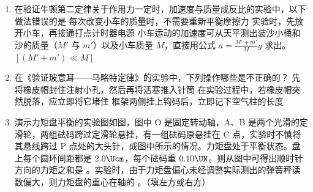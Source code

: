 \documentclass[\gkver]{gaokaozhenti}
\begin{document}
\begin{enumerate}
\item
在验证牛顿第二定律关于作用力一定时，加速度与质量成反比的实验中，以下做法错误的是
{每次改变小车的质量时，不需要重新平衡摩擦力}
{实验时，先放开小车，再接通打点计时器电源}
{小车运动的加速度可从天平测出装沙小桶和沙的质量（$M'$ 与 $m'$）以及小车质量 $M$，直接用公式 $a = \frac{M' + m'}{M}g$ 求出。$[(M' + m') \ll M]$}

\item
在《验证玻意耳——马略特定律》的实验中，下列操作哪些是不正确的？
{先将橡皮帽封住注射小孔，然后再将活塞推入针筒}
{在实验过程中，若橡皮帽突然脱落，应立即将它堵住}
{框架两侧挂上钩码后，立即记下空气柱的长度}

\item
演示力矩盘平衡的实验图如图，图中 O 是固定转动轴，A、B 是两个光滑的定滑轮，两组砝码跨过定滑轮悬挂，有一组砝码原悬挂在 C 点，实验时不慎将其悬线跨过 P 点处的大头针，成图中所示的情况。力矩盘处于平衡状态。盘上每个圆环间距都是 $2.0\Ucm$，每个砝码重 $0.10\UN$。则从图中可得出顺时针方向的力矩之和是 \tkanswer[2.4cm]{$0.04\UNcdotm$}。实验时，由于力矩盘偏心未经调整实际测出的弹簧秤读数偏大，则力矩盘的重心在轴的 。（填左方或右方）
\onepicture[align=right]{}


\end{enumerate}
\end{document}
